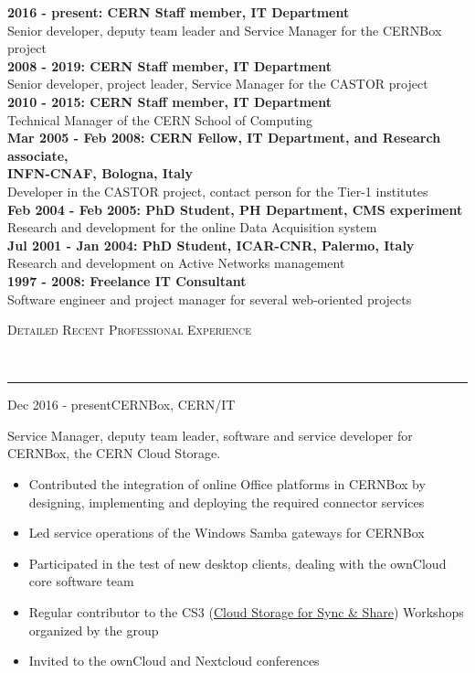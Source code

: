 \documentclass[11pt]{article}
\renewcommand{\section}[2]%
        {\vspace{1.3\baselineskip}%
         \hspace{0in}%
         {\raggedright \scshape #1}\\[-0.15\baselineskip]%
                 \rule{\columnwidth}{1pt}%
        \vspace{.5\baselineskip}%
         \hspace{0in}
}
\renewcommand{\subsection}[2]%
        {
         {\bf{\raggedright \scshape #1}}{\bf{\hfill \scshape #2}}\\[-.7\baselineskip]
}
\newenvironment{CompactItemize} {
  \begin{itemize}
  \setlength{\itemsep}{-3pt}
  \setlength{\parsep}{0pt}
  \setlength{\topsep}{-2pt}
  \setlength{\partopsep}{-2pt}
} {\end{itemize}}
\begin{document}
\textbf{2016 - present: CERN Staff member, IT Department}\\
Senior developer, deputy team leader and Service Manager for the CERNBox project\\[.3\baselineskip]
\textbf{2008 - 2019: CERN Staff member, IT Department}\\
Senior developer, project leader, Service Manager for the CASTOR project\\[.3\baselineskip]
\textbf{2010 - 2015: CERN Staff member, IT Department}\\
Technical Manager of the CERN School of Computing\\[.3\baselineskip]
\textbf{Mar 2005 - Feb 2008: CERN Fellow, IT Department, and Research associate,\\ INFN-CNAF, Bologna, Italy}\\
Developer in the CASTOR project, contact person for the Tier-1 institutes\\[.3\baselineskip]
\textbf{Feb 2004 - Feb 2005: PhD Student, PH Department, CMS experiment}\\
Research and development for the online Data Acquisition system\\[.3\baselineskip]
\textbf{Jul 2001 - Jan 2004: PhD Student, ICAR-CNR, Palermo, Italy}\\
Research and development on Active Networks management\\[.3\baselineskip]
\textbf{1997 - 2008: Freelance IT Consultant}\\
Software engineer and project manager for several web-oriented projects


\section{Detailed Recent Professional Experience}

\subsection{Dec 2016 - present}{CERNBox, CERN/IT}

Service Manager, deputy team leader, software and service developer for CERNBox, the CERN Cloud Storage.

\begin{CompactItemize}
\item Contributed the integration of online Office platforms in CERNBox by designing, implementing and deploying the required connector services
\item Led service operations of the Windows Samba gateways for CERNBox
\item Participated in the test of new desktop clients, dealing with the ownCloud core software team
\item Regular contributor to the CS3 (\href{https://www.cs3community.org/}{Cloud Storage for Sync \& Share}) Workshops organized by the group
\item Invited to the ownCloud and Nextcloud conferences
\end{CompactItemize}
\end{document}
